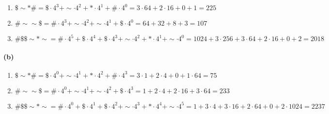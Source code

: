 \documentclass[a4paper]{article}
\begin{document}
\begin{enumerate}
	\item $ \$ \sim *\# = \$\cdot 4^3 + \sim\cdot4^2 + *\cdot 4^1 + \#\cdot4^0 = 3\cdot 64 + 2\cdot 16 + 0 + 1 = 225$ 
	\item $ \#\sim\sim\$ = \#\cdot4^3 + \sim\cdot4^2 + \sim\cdot4^1 + \$\cdot4^0 = 64 + 32 + 8 + 3 = 107$
	\item $ \#\$\$\sim * \sim = \#\cdot4^5 + \$\cdot 4^4 + \$\cdot 4^3 + \sim\cdot4^2 + *\cdot4^1 + \sim\cdot4^0 =1024 + 3\cdot256 + 3\cdot 64 + 2\cdot 16 + 0 + 2 = 2018  $	
\end{enumerate}

\paragraph{(b)}

\begin{enumerate}
	\item $ \$ \sim *\# = \$\cdot 4^0 + \sim\cdot4^1 + *\cdot 4^2 + \#\cdot4^3 = 3\cdot1 + 2\cdot 4  + 0 + 1\cdot64 = 75$ 
	\item $ \#\sim\sim\$ = \#\cdot4^0 + \sim\cdot4^1 + \sim\cdot4^2 + \$\cdot4^3 = 1 + 2\cdot4 + 2\cdot16 + 3\cdot64 = 233$
	\item $ \#\$\$\sim * \sim = \#\cdot4^0 + \$\cdot 4^1 + \$\cdot 4^2 + \sim\cdot4^3 + *\cdot4^4 + \sim\cdot4^5 = 1 + 3\cdot4 + 3\cdot16 + 2\cdot64 + 0 + 2\cdot1024 = 2237$	
\end{enumerate}
      
\end{document}
